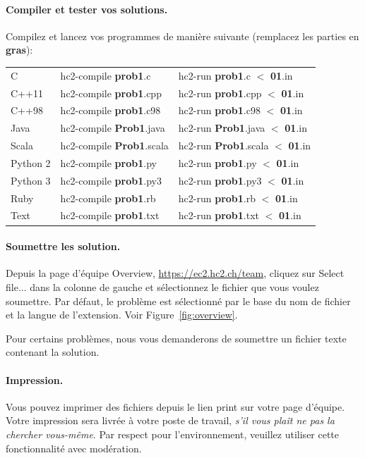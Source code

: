 \paragraph{Compiler et tester vos solutions.}
Compilez et lancez vos programmes de manière suivante (remplacez les parties en \textbf{gras}):
\begin{center}
\begin{tabular}{l|p{5cm}|p{7cm}}
C&hc2-compile \textbf{prob1}.c &hc2-run \textbf{prob1}.c $<$ \textbf{01}.in\\
C++11&hc2-compile \textbf{prob1}.cpp &hc2-run \textbf{prob1}.cpp $<$ \textbf{01}.in\\
C++98&hc2-compile \textbf{prob1}.c98 &hc2-run \textbf{prob1}.c98 $<$ \textbf{01}.in\\
Java&hc2-compile \textbf{Prob1}.java &hc2-run \textbf{Prob1}.java $<$ \textbf{01}.in\\
Scala&hc2-compile \textbf{Prob1}.scala &hc2-run \textbf{Prob1}.scala $<$ \textbf{01}.in\\
Python 2&hc2-compile \textbf{prob1}.py &hc2-run \textbf{prob1}.py $<$ \textbf{01}.in\\
Python 3&hc2-compile \textbf{prob1}.py3 &hc2-run \textbf{prob1}.py3 $<$ \textbf{01}.in\\
Ruby&hc2-compile \textbf{prob1}.rb &hc2-run \textbf{prob1}.rb $<$ \textbf{01}.in\\
Text&hc2-compile \textbf{prob1}.txt &hc2-run \textbf{prob1}.txt $<$ \textbf{01}.in\\
\end{tabular}
\end{center}

\paragraph{Soumettre les solution.}
Depuis la page d'équipe \og Overview\fg{},
\url{https://ec2.hc2.ch/team},
cliquez sur \og Select file...\fg{} dans la colonne de gauche et 
sélectionnez le fichier que vous voulez soumettre.
Par défaut, le problème est sélectionné par le
base du nom de fichier et la langue de l'extension.
Voir Figure~\ref{fig:overview}.

Pour certains problèmes, nous vous demanderons de soumettre un
fichier texte contenant la solution.

\paragraph{Impression.}
Vous pouvez imprimer des fichiers depuis le lien \og print \fg{}
sur votre page d'équipe.
Votre impression sera livrée à votre poste de travail,
\emph{s'il vous plaît ne pas la chercher vous-même}.
Par respect pour l'environnement, 
veuillez utiliser cette fonctionnalité avec modération. 


